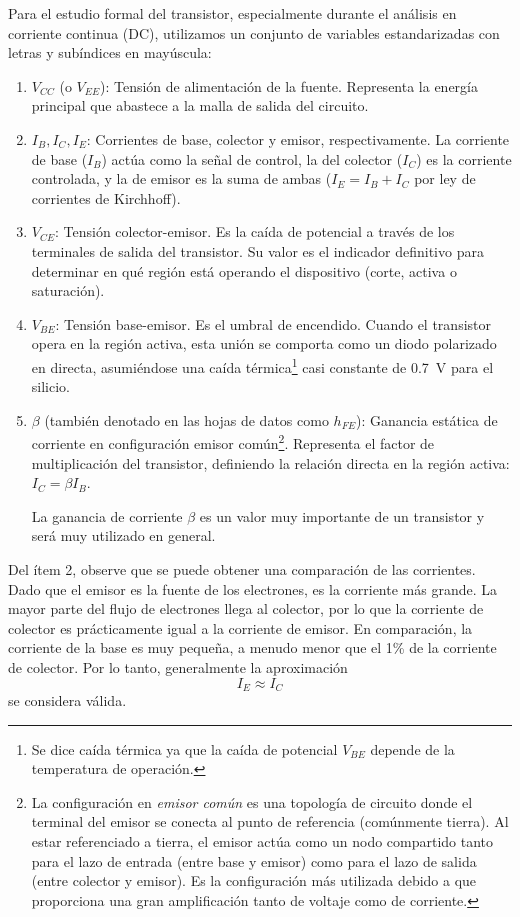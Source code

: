 Para el estudio formal del transistor, especialmente durante el análisis en corriente continua (DC), utilizamos un conjunto de variables estandarizadas con letras y subíndices en mayúscula:
\begin{enumerate}
  \item \(V_{CC}\) (o \(V_{EE}\)): Tensión de alimentación de la fuente. Representa la energía principal que abastece a la malla de salida del circuito.
  \item \(I_B, I_C, I_E\): Corrientes de base, colector y emisor, respectivamente. La corriente de base (\(I_B\)) actúa como la señal de control, la del colector (\(I_C\)) es la corriente controlada, y la de emisor es la suma de ambas (\(I_E = I_B + I_C\) por ley de corrientes de Kirchhoff).
  \item \(V_{CE}\): Tensión colector-emisor. Es la caída de potencial a través de los terminales de salida del transistor. Su valor es el indicador definitivo para determinar en qué región está operando el dispositivo (corte, activa o saturación).
  \item \(V_{BE}\): Tensión base-emisor. Es el umbral de encendido. Cuando el transistor opera en la región activa, esta unión se comporta como un diodo polarizado en directa, asumiéndose una caída térmica\footnote{Se dice caída térmica ya que la caída de potencial \(V_{BE}\) depende de la temperatura de operación.} casi constante de \qty{0.7}{\volt} para el silicio.
  \item \(\beta\) (también denotado en las hojas de datos como \(h_{FE}\)): Ganancia estática de corriente en configuración emisor común\footnote{La configuración en \emph{emisor común} es una topología de circuito donde el terminal del emisor se conecta al punto de referencia (comúnmente tierra). Al estar referenciado a tierra, el emisor actúa como un nodo compartido tanto para el lazo de entrada (entre base y emisor) como para el lazo de salida (entre colector y emisor). Es la configuración más utilizada debido a que proporciona una gran amplificación tanto de voltaje como de corriente.}. Representa el factor de multiplicación del transistor, definiendo la relación directa en la región activa: \(I_C = \beta I_B\).

    La ganancia de corriente \(\beta\) es un valor muy importante de un transistor y será muy utilizado en general.
\end{enumerate}

Del ítem 2, observe que se puede obtener una comparación de las corrientes. Dado que el emisor es la fuente de los electrones, es la corriente más grande. La mayor parte del flujo de electrones llega al colector, por lo que la corriente de colector es prácticamente igual a la corriente de emisor. En comparación, la corriente de la base es muy pequeña, a menudo menor que el 1\% de la corriente de colector. Por lo tanto, generalmente la aproximación 
\[
  I_E \approx I_C
\]
se considera válida.

